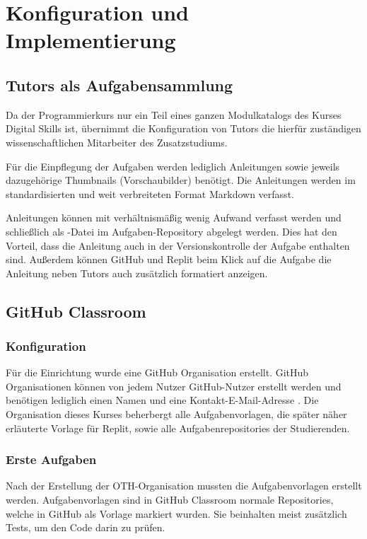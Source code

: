 \section{Konfiguration und Implementierung}\label{konfiguration-u-impl}


\subsection{Tutors als Aufgabensammlung}\label{tutors-als-aufgabensammlung}
Da der Programmierkurs nur ein Teil eines ganzen Modulkatalogs des Kurses
Digital Skills ist, übernimmt die Konfiguration von Tutors die hierfür
zuständigen wissenschaftlichen Mitarbeiter des Zusatzstudiums.

Für die Einpflegung der Aufgaben werden lediglich Anleitungen sowie
jeweils dazugehörige Thumbnails (Vorschaubilder) benötigt. Die Anleitungen
werden im standardisierten und weit verbreiteten Format Markdown verfasst.

Anleitungen können mit verhältnismäßig wenig Aufwand verfasst werden und
schließlich als -Datei im Aufgaben-Repository abgelegt
werden. Dies hat den Vorteil, dass die Anleitung auch in der Versionskontrolle
der Aufgabe enthalten sind. Außerdem können GitHub und Replit beim Klick auf die
Aufgabe die Anleitung neben Tutors auch zusätzlich formatiert anzeigen.

\subsection{GitHub Classroom}\label{github-classroom}
\subsubsection{Konfiguration}\label{classroom-konfiguration}
Für die Einrichtung wurde eine GitHub Organisation erstellt. GitHub
Organisationen können von jedem Nutzer GitHub-Nutzer erstellt werden und
benötigen lediglich einen Namen und eine Kontakt-E-Mail-Adresse
\parencite{github-organisation-erstellen}. Die Organisation dieses Kurses beherbergt
alle Aufgabenvorlagen, die später näher erläuterte Vorlage für Replit, sowie
alle Aufgabenrepositories der Studierenden.

\subsubsection{Erste Aufgaben}\label{classroom-erste-aufgaben}
Nach der Erstellung der OTH-Organisation mussten die Aufgabenvorlagen erstellt
werden. Aufgabenvorlagen sind in GitHub Classroom normale Repositories, welche
in GitHub als Vorlage markiert wurden. Sie beinhalten meist zusätzlich Tests, um
den Code darin zu prüfen.

